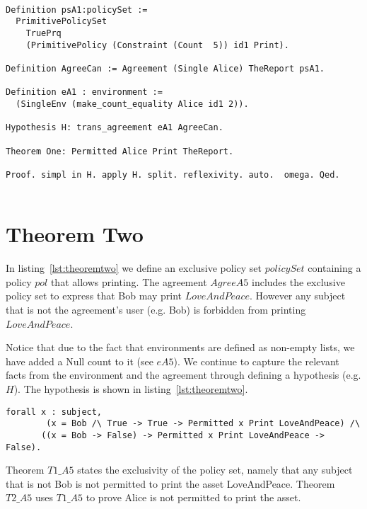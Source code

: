 \lstset{language=Coq}
\begin{lstlisting}[frame=single, caption={Theorem One},label={lst:theoremone}]

Definition psA1:policySet :=
  PrimitivePolicySet
    TruePrq
    (PrimitivePolicy (Constraint (Count  5)) id1 Print).

Definition AgreeCan := Agreement (Single Alice) TheReport psA1.

Definition eA1 : environment := 
  (SingleEnv (make_count_equality Alice id1 2)).

Hypothesis H: trans_agreement eA1 AgreeCan.

Theorem One: Permitted Alice Print TheReport.

Proof. simpl in H. apply H. split. reflexivity. auto.  omega. Qed.


\end{lstlisting}

\section{Theorem Two}

In listing~\ref{lst:theoremtwo} we define an exclusive policy set $policySet$ containing a policy $pol$ that allows printing. The agreement $AgreeA5$ includes the exclusive policy set to express that Bob may print $LoveAndPeace$. However any subject that is not the agreement's user (e.g. Bob) is forbidden from printing $LoveAndPeace$. 

Notice that due to the fact that environments are defined as non-empty lists, we have added a Null count to it (see $eA5$). We continue to capture the relevant facts from the environment and the agreement through defining a hypothesis (e.g. $H$). The hypothesis is shown in listing~\ref{lst:theoremtwo}. 

\lstset{language=Coq}
\begin{lstlisting}[frame=single, caption={Hypothesis for Theorem Two}, label={lst:theoremtwohypo}]
forall x : subject, 
        (x = Bob /\ True -> True -> Permitted x Print LoveAndPeace) /\
       ((x = Bob -> False) -> Permitted x Print LoveAndPeace -> False). 
\end{lstlisting}

Theorem $T1\_A5$ states the exclusivity of the policy set, namely that any subject that is not Bob is not permitted to print the asset LoveAndPeace. Theorem $T2\_A5$ uses $T1\_A5$ to prove Alice is not permitted to print the asset.

